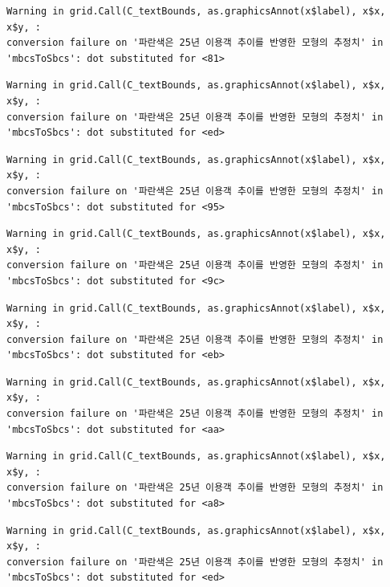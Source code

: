 \documentclass[
  letterpaper,
  DIV=11,
  numbers=noendperiod]{scrreprt}
\begin{document}
\begin{verbatim}
Warning in grid.Call(C_textBounds, as.graphicsAnnot(x$label), x$x, x$y, :
conversion failure on '파란색은 25년 이용객 추이를 반영한 모형의 추정치' in
'mbcsToSbcs': dot substituted for <81>
\end{verbatim}

\begin{verbatim}
Warning in grid.Call(C_textBounds, as.graphicsAnnot(x$label), x$x, x$y, :
conversion failure on '파란색은 25년 이용객 추이를 반영한 모형의 추정치' in
'mbcsToSbcs': dot substituted for <ed>
\end{verbatim}

\begin{verbatim}
Warning in grid.Call(C_textBounds, as.graphicsAnnot(x$label), x$x, x$y, :
conversion failure on '파란색은 25년 이용객 추이를 반영한 모형의 추정치' in
'mbcsToSbcs': dot substituted for <95>
\end{verbatim}

\begin{verbatim}
Warning in grid.Call(C_textBounds, as.graphicsAnnot(x$label), x$x, x$y, :
conversion failure on '파란색은 25년 이용객 추이를 반영한 모형의 추정치' in
'mbcsToSbcs': dot substituted for <9c>
\end{verbatim}

\begin{verbatim}
Warning in grid.Call(C_textBounds, as.graphicsAnnot(x$label), x$x, x$y, :
conversion failure on '파란색은 25년 이용객 추이를 반영한 모형의 추정치' in
'mbcsToSbcs': dot substituted for <eb>
\end{verbatim}

\begin{verbatim}
Warning in grid.Call(C_textBounds, as.graphicsAnnot(x$label), x$x, x$y, :
conversion failure on '파란색은 25년 이용객 추이를 반영한 모형의 추정치' in
'mbcsToSbcs': dot substituted for <aa>
\end{verbatim}

\begin{verbatim}
Warning in grid.Call(C_textBounds, as.graphicsAnnot(x$label), x$x, x$y, :
conversion failure on '파란색은 25년 이용객 추이를 반영한 모형의 추정치' in
'mbcsToSbcs': dot substituted for <a8>
\end{verbatim}

\begin{verbatim}
Warning in grid.Call(C_textBounds, as.graphicsAnnot(x$label), x$x, x$y, :
conversion failure on '파란색은 25년 이용객 추이를 반영한 모형의 추정치' in
'mbcsToSbcs': dot substituted for <ed>
\end{verbatim}
\end{document}

